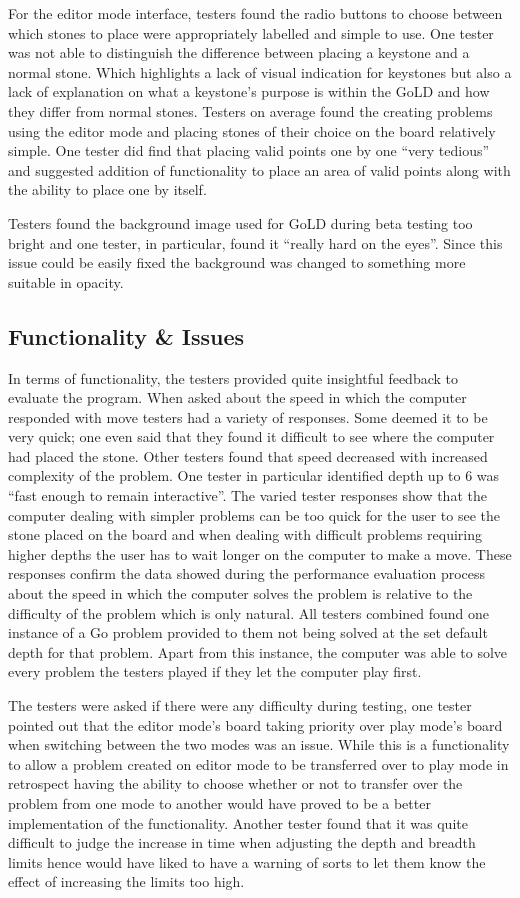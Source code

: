 \documentclass{l4proj}
\begin{document}
For the editor mode interface, testers found the radio buttons to choose between which stones to place were appropriately labelled and simple to use. One tester was not able to distinguish the difference between placing a keystone and a normal stone. Which highlights a lack of visual indication for keystones but also a lack of explanation on what a keystone’s purpose is within the GoLD and how they differ from normal stones. Testers on average found the creating problems using the editor mode and placing stones of their choice on the board relatively simple. One tester did find that placing valid points one by one “very tedious” and suggested addition of functionality to place an area of valid points along with the ability to place one by itself.

Testers found the background image used for GoLD during beta testing too bright and one tester, in particular, found it “really hard on the eyes”.  Since this issue could be easily fixed the background was changed to something more suitable in opacity.

\subsection{Functionality \& Issues}
In terms of functionality, the testers provided quite insightful feedback to evaluate the program. When asked about the speed in which the computer responded with move testers had a variety of responses. Some deemed it to be very quick; one even said that they found it difficult to see where the computer had placed the stone. Other testers found that speed decreased with increased complexity of the problem. One tester in particular identified depth up to 6 was “fast enough to remain interactive”. The varied tester responses show that the computer dealing with simpler problems can be too quick for the user to see the stone placed on the board and when dealing with difficult problems requiring higher depths the user has to wait longer on the computer to make a move. These responses confirm the data showed during the performance evaluation process about the speed in which the computer solves the problem is relative to the difficulty of the problem which is only natural.
All testers combined found one instance of a Go problem provided to them not being solved at the set default depth for that problem. Apart from this instance, the computer was able to solve every problem the testers played if they let the computer play first.

The testers were asked if there were any difficulty during testing, one tester pointed out that the editor mode’s board taking priority over play mode’s board when switching between the two modes was an issue. While this is a functionality to allow a problem created on editor mode to be transferred over to play mode in retrospect having the ability to choose whether or not to transfer over the problem from one mode to another would have proved to be a better implementation of the functionality. Another tester found that it was quite difficult to judge the increase in time when adjusting the depth and breadth limits hence would have liked to have a warning of sorts to let them know the effect of increasing the limits too high.
\end{document}
